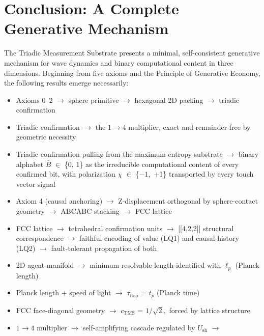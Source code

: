 \documentclass[11pt,oneside]{report}
\theoremstyle{definition}
\theoremstyle{remark}
\begin{document}
\section*{Conclusion: A Complete Generative Mechanism}

The Triadic Measurement Substrate presents a minimal, self-consistent
generative mechanism for wave dynamics and binary computational content
in three dimensions. Beginning from five axioms and the Principle of
Generative Economy, the following results emerge necessarily:

\begin{itemize}
\item
  Axioms 0--2 \ensuremath{\to} sphere primitive \ensuremath{\to} hexagonal 2D packing \ensuremath{\to} triadic
  confirmation
\item
  Triadic confirmation \ensuremath{\to} the \ensuremath{1\to 4} multiplier, exact and remainder-free by
  geometric necessity
\item
  Triadic confirmation pulling from the maximum-entropy substrate \ensuremath{\to}
  binary alphabet \ensuremath{\bar{B}} \ensuremath{\in} \{0, 1\} as the irreducible computational content
  of every confirmed bit, with polarization \ensuremath{\chi} \ensuremath{\in} \{\ensuremath{-1,} +1\} transported
  by every touch vector signal
\item
  Axiom 4 (causal anchoring) \ensuremath{\to} Z-displacement orthogonal by
  sphere-contact geometry \ensuremath{\to} ABCABC stacking \ensuremath{\to} FCC lattice
\item
  FCC lattice \ensuremath{\to} tetrahedral confirmation units \ensuremath{\to} [[4,2,2]]
  structural correspondence \ensuremath{\to} faithful encoding of value (LQ1) and
  causal-history (LQ2) \ensuremath{\to} fault-tolerant propagation of both
\item
  2D agent manifold \ensuremath{\to} minimum resolvable length identified with \ensuremath{\ell_{p}}
  (Planck length)
\item
  Planck length + speed of light \ensuremath{\to} \ensuremath{\tau_{\mathrm{flop}}} = \ensuremath{t_{p}} (Planck time)
\item
  FCC face-diagonal geometry \ensuremath{\to} \ensuremath{c_{\mathrm{TMS}}} = \ensuremath{1/\sqrt{2},} forced by lattice structure
\item
  \ensuremath{1\to 4} multiplier \ensuremath{\to} self-amplifying cascade regulated by \ensuremath{U_{\mathrm{sh}}} \ensuremath{\to}

\end{itemize}
\end{document}
